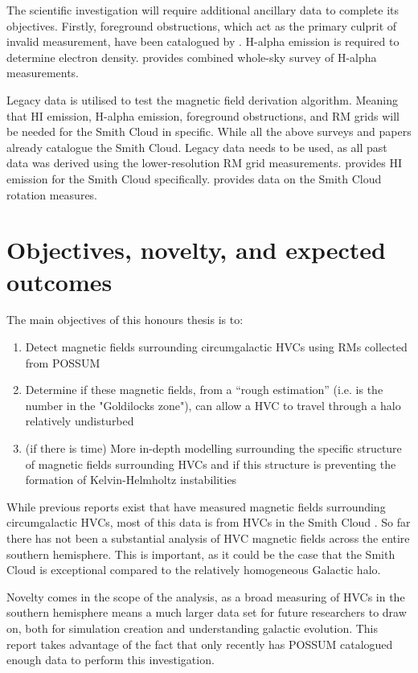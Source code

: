 The scientific investigation will require additional ancillary data to complete its objectives. Firstly, foreground obstructions, which act as the primary culprit of invalid measurement, have been catalogued by \citep{ID44, ID45}. H-alpha emission is required to determine electron density. \citep{ID43} provides combined whole-sky survey of H-alpha measurements.

Legacy data is utilised to test the magnetic field derivation algorithm. Meaning that HI emission, H-alpha emission, foreground obstructions, and RM grids will be needed for the Smith Cloud in specific. While all the above surveys and papers already catalogue the Smith Cloud. Legacy data needs to be used, as all past data was derived using the lower-resolution RM grid measurements. \citep{ID28} provides HI emission for the Smith Cloud specifically. \citep{ID18} provides data on the Smith Cloud rotation measures.

\section{Objectives, novelty, and expected outcomes}
\label{sec:objectives}

The main objectives of this honours thesis is to:
\begin{enumerate}
\item Detect magnetic fields surrounding circumgalactic HVCs using RMs collected from POSSUM
\item Determine if these magnetic fields, from a “rough estimation” (i.e. is the number in the "Goldilocks zone"), can allow a HVC to travel through a halo relatively undisturbed
\item (if there is time) More in-depth modelling surrounding the specific structure of magnetic fields surrounding HVCs and if this structure is preventing the formation of Kelvin-Helmholtz instabilities
\end{enumerate}

While previous reports exist that have measured magnetic fields surrounding circumgalactic HVCs, most of this data is from HVCs in the Smith Cloud \cite{ID2, ID5, ID23, ID26}. So far there has not been a substantial analysis of HVC magnetic fields  across the entire southern hemisphere. This is important, as it could be the case that the Smith Cloud is exceptional compared to the relatively homogeneous Galactic halo.

Novelty comes in the scope of the analysis, as a broad measuring of HVCs in the southern hemisphere means a much larger data set for future researchers to draw on, both for simulation creation and understanding galactic evolution. This report takes advantage of the fact that only recently has POSSUM catalogued enough data to perform this investigation.


